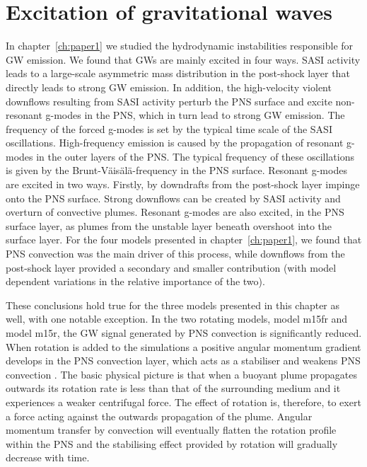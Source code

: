 \section{Excitation of gravitational waves} \label{sec:p2ext}
In chapter~\ref{ch:paper1} we studied the hydrodynamic instabilities responsible for GW emission.
We found that GWs are mainly excited in four ways. SASI activity leads to a large-scale asymmetric mass distribution in the post-shock layer that directly leads to strong GW emission. In addition, the high-velocity 
violent downflows resulting from SASI activity perturb the PNS surface and excite non-resonant g-modes in the PNS,
which in turn lead to strong GW emission. The frequency of the forced g-modes 
is set by the typical time scale of the SASI oscillations. High-frequency emission is caused by the propagation of
resonant g-modes in the outer layers of the PNS. The typical frequency of these oscillations is given by the
Brunt-V\"{a}is\"{a}l\"{a}-frequency in the PNS surface. Resonant g-modes are excited in two ways.
Firstly, by downdrafts from the post-shock layer impinge onto the PNS surface. Strong downflows can be created by SASI 
activity and overturn of convective plumes. Resonant g-modes are also excited, in the PNS surface layer,
as plumes from the unstable layer beneath overshoot into the surface layer.
For the four models presented in chapter~\ref{ch:paper1}, we found that PNS convection was the main driver
of this process, while downflows from the post-shock layer provided a secondary and smaller
contribution (with model dependent variations in the relative importance of the two).

These conclusions hold true for the three models presented in this chapter as well, with one notable
exception. In the two rotating models, model m15fr and model m15r, the GW signal generated by PNS 
convection is significantly reduced. When rotation is added to the simulations a positive
angular momentum gradient develops in the PNS convection layer, which acts as a stabiliser and weakens PNS
convection \citep{janka_01b}. 
The basic physical picture is that when a buoyant plume propagates outwards its rotation rate
is less than that of the surrounding medium and it experiences a weaker centrifugal force.
The effect of rotation is, therefore, to exert a force acting against the outwards propagation of the plume.
Angular momentum transfer by convection will eventually flatten the rotation profile within the PNS and 
the stabilising effect provided by rotation will gradually decrease with time.

